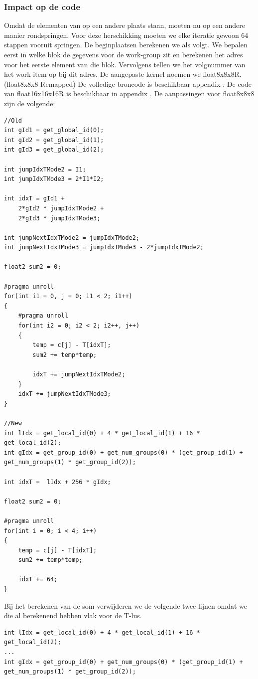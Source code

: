 
\subsubsection{Impact op de code}
Omdat de elementen van \TT{} op een andere plaats staan, moeten nu op een andere manier rondspringen. Voor deze herschikking moeten we elke iteratie gewoon 64 stappen vooruit springen. De beginplaatsen berekenen we als volgt. We bepalen eerst in welke blok de gegevens voor de work-group zit en berekenen het adres voor het eerste element van die blok. Vervolgens tellen we het volgnummer van het work-item op bij dit adres. De aangepaste kernel noemen we float8x8x8R. (float8x8x8 Remapped) De volledige broncode is beschikbaar appendix . De code van float16x16x16R is beschikbaar in appendix . De aanpassingen voor float8x8x8 zijn de volgende:
\begin{lstlisting}
//Old
int gId1 = get_global_id(0);
int gId2 = get_global_id(1);
int gId3 = get_global_id(2);

int jumpIdxTMode2 = I1;
int jumpIdxTMode3 = 2*I1*I2;

int idxT = gId1 + 
	2*gId2 * jumpIdxTMode2 +
	2*gId3 * jumpIdxTMode3;

int jumpNextIdxTMode2 = jumpIdxTMode2;
int jumpNextIdxTMode3 = jumpIdxTMode3 - 2*jumpIdxTMode2;

float2 sum2 = 0;

#pragma unroll
for(int i1 = 0, j = 0; i1 < 2; i1++)
{
	#pragma unroll
	for(int i2 = 0; i2 < 2; i2++, j++)
	{
		temp = c[j] - T[idxT];
		sum2 += temp*temp;
		
		idxT += jumpNextIdxTMode2;
	}
	idxT += jumpNextIdxTMode3;
}

//New
int lIdx = get_local_id(0) + 4 * get_local_id(1) + 16 * get_local_id(2);
int gIdx = get_group_id(0) + get_num_groups(0) * (get_group_id(1) + get_num_groups(1) * get_group_id(2));

int idxT =  lIdx + 256 * gIdx;   

float2 sum2 = 0;

#pragma unroll
for(int i = 0; i < 4; i++)
{
	temp = c[j] - T[idxT];
	sum2 += temp*temp;
		
	idxT += 64;
}
\end{lstlisting}
Bij het berekenen van de som verwijderen we de volgende twee lijnen omdat we die al berekenend hebben vlak voor de T-lus.
\begin{lstlisting}
int lIdx = get_local_id(0) + 4 * get_local_id(1) + 16 * get_local_id(2);
...
int gIdx = get_group_id(0) + get_num_groups(0) * (get_group_id(1) + get_num_groups(1) * get_group_id(2));
\end{lstlisting}

